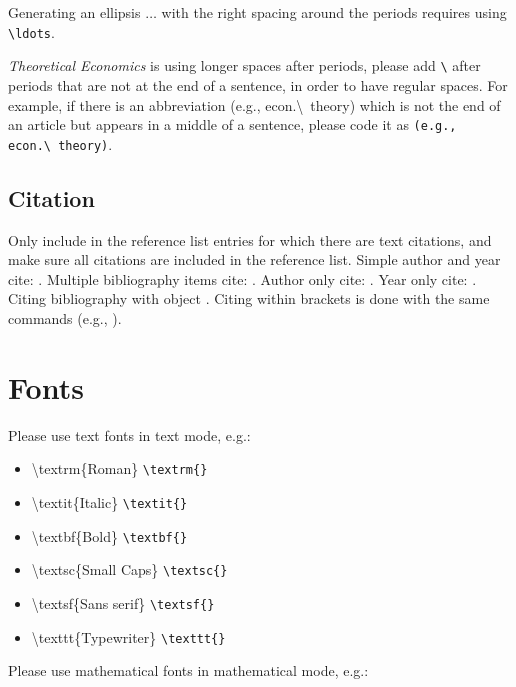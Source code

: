\documentclass[qe,nameyear,draft]{econsocart}
\theoremstyle{plain}
\theoremstyle{remark}
\begin{document}
Generating an ellipsis $\ldots$ with the right spacing around the periods requires using \texttt{{\textbackslash}ldots}.

\textit{Theoretical Economics} is using longer spaces after periods, please add \texttt{{\textbackslash}} after periods that are not at the end of a sentence, in order to have regular spaces. For example, if there is an abbreviation (e.g., econ.{\textbackslash}~theory) which is not the end of an article but appears in a middle of a sentence, please code it as \texttt{(e.g., econ.{\textbackslash}~theory)}.

\subsection{Citation}

Only include in the reference list entries for which there are text citations,
and make sure all citations are included in the reference list.
Simple author and year cite: \cite{b1}.
Multiple bibliography items cite: \citep{b2, b3, b4, b5}.
Author only cite: \citet{b4}.
Year only cite: \citep{b4}. Citing bibliography with object \cite{b1}. Citing within brackets is done with the same commands (e.g., \citep{b2, b3, b4}).

\section{Fonts}

Please use text fonts in text mode, e.g.:

\begin{itemize}
\item {\textbackslash}textrm\{Roman\} \texttt{{\textbackslash}textrm\{\}}
\item {\textbackslash}textit\{Italic\} \texttt{{\textbackslash}textit\{\}}
\item {\textbackslash}textbf\{Bold\} \texttt{{\textbackslash}textbf\{\}}
\item {\textbackslash}textsc\{Small Caps\} \texttt{{\textbackslash}textsc\{\}}
\item {\textbackslash}textsf\{Sans serif\} \texttt{{\textbackslash}textsf\{\}}
\item {\textbackslash}texttt\{Typewriter\} \texttt{{\textbackslash}texttt\{\}}
\end{itemize}

Please use mathematical fonts in mathematical mode, e.g.:
\end{document}
